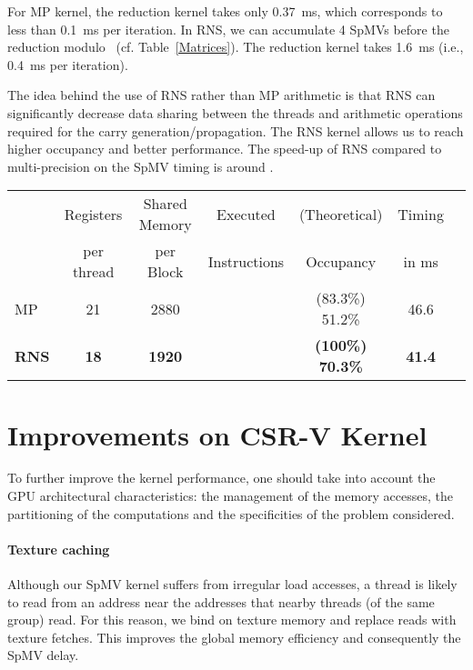 \documentclass[runningheads,orivec]{llncs}
\begin{document}
For MP kernel, the reduction kernel takes only 0.37~ms, which corresponds to less than 0.1~ms per iteration. In RNS, we can accumulate 4 SpMVs before the reduction modulo~ (cf. Table~\ref{Matrices}). The reduction kernel takes 1.6~ms (i.e., 0.4~ms per iteration).   

The idea behind the use of RNS rather than MP arithmetic is that RNS can significantly decrease data sharing between the threads and arithmetic operations required for the carry generation/propagation. The RNS kernel allows us to reach higher occupancy and better performance. The speed-up of RNS compared to multi-precision on the SpMV timing is around .

\vspace*{-0.25cm}



\begin{center}
	\begin{tabular}{|l||c|c|c|c|c|c|}
      \hline
        & \footnotesize Registers & \footnotesize Shared Memory & \footnotesize Executed & \footnotesize (Theoretical) & \footnotesize Timing\\
        & \footnotesize per thread & \footnotesize per Block & \footnotesize Instructions & \footnotesize Occupancy & \footnotesize in ms\\  
      \hline
      \hline
      \footnotesize MP & \footnotesize 21 & \footnotesize 2880 & \footnotesize  & \footnotesize (83.3\%) 51.2\% & \footnotesize 46.6\\
      \bf \footnotesize RNS & \bf \footnotesize 18 & \bf \footnotesize 1920 & \bf \footnotesize  & \bf \footnotesize (100\%) 70.3\% & \bf \footnotesize 41.4\\
      \hline
    \end{tabular}    
\end{center}

\vspace*{-0.25cm}

\section{Improvements on CSR-V Kernel}
\label{optimizations}
To further improve the kernel performance, one should take into account the GPU architectural characteristics: the management of the memory accesses, the partitioning of the computations and the specificities of the problem considered.
	
\paragraph{\bf Texture caching}
Although our SpMV kernel suffers from irregular load accesses, a thread is likely to read from an address near the addresses that nearby threads (of the same group) read. For this reason, we bind on texture memory and replace reads with texture fetches. This improves the global memory efficiency and consequently the SpMV delay.     
\end{document}
